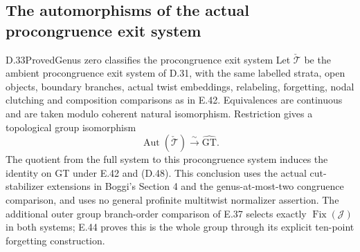 \subsection{The automorphisms of the actual procongruence exit system}

\begin{result}{D.33}{Proved}{Genus zero classifies the procongruence exit system}
Let $\check{\mathcal T}$ be the ambient procongruence exit
system of D.31, with the same labelled strata, open objects,
boundary branches, actual twist embeddings, relabeling,
forgetting, nodal clutching and composition comparisons
as in E.42.  Equivalences are continuous and are taken
modulo coherent natural isomorphism.  Restriction gives
a topological group isomorphism
\[
       \operatorname{Aut}(\check{\mathcal T})
                       \xrightarrow{\sim}\widehat{\mathrm{GT}}.
                                                               \tag{D.48}
\]
The quotient from the full system to this procongruence
system induces the identity on GT under E.42 and (D.48).
This conclusion uses the actual cut-stabilizer extensions
in Boggi's Section 4 and the genus-at-most-two congruence
comparison, and uses no general profinite multitwist
normalizer assertion.  The additional outer group
branch-order comparison of E.37 selects exactly
$\operatorname{Fix}(\mathcal J)$ in both systems; E.44
proves this is the whole group through its explicit
ten-point forgetting construction.
\end{result}
